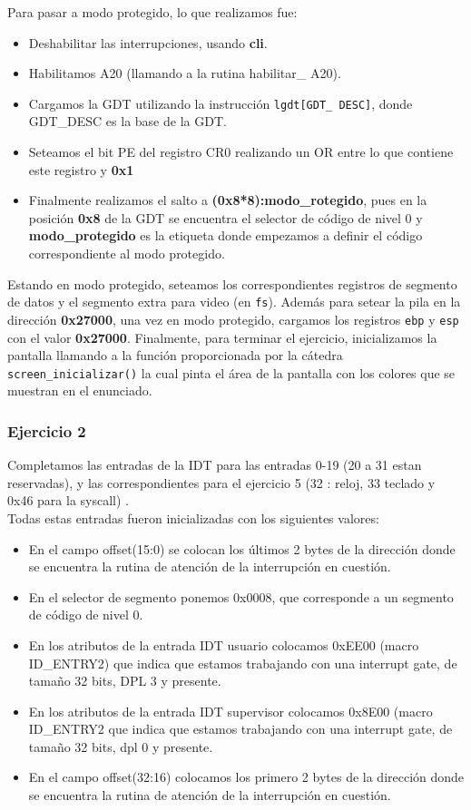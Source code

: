Para pasar a modo protegido, lo que realizamos fue:
\begin{itemize}
	\item Deshabilitar las interrupciones, usando \textbf{cli}.
	\item Habilitamos A20 (llamando a la rutina habilitar\_ A20).
	\item Cargamos la GDT utilizando la instrucción \texttt{lgdt[GDT\_ DESC]}, donde GDT\_DESC es la base de la GDT.
	\item Seteamos el bit PE del registro CR0 realizando un OR entre lo que contiene este registro y \textbf{0x1}
	\item Finalmente realizamos el salto a \textbf{(0x8*8):modo\_rotegido}, pues en la posición \textbf{0x8} de la GDT se encuentra el selector de código de nivel 0 y \textbf{modo\_protegido} es la etiqueta donde empezamos a definir el código correspondiente al modo protegido.
\end{itemize}
Estando en modo protegido, seteamos los correspondientes registros de segmento de datos y el segmento
extra para video (en \texttt{fs}). Además para setear la pila en la dirección \textbf{0x27000}, una vez en modo protegido, cargamos los registros \texttt{ebp} y \texttt{esp} con el valor \textbf{0x27000}.
Finalmente, para terminar el ejercicio, inicializamos la pantalla llamando a la función proporcionada por la cátedra \texttt{screen\_inicializar()} la cual pinta el área de la pantalla con los colores que se muestran en el enunciado.


\subsubsection{Ejercicio 2}
\indent Completamos las entradas de la IDT para las entradas 0-19 (20 a 31 estan reservadas), y las correspondientes para el ejercicio 5 (32 : reloj, 33 teclado y 0x46 para la syscall) .\\
\indent Todas estas entradas fueron inicializadas con los siguientes valores:
\begin{itemize}
 \item En el campo offset(15:0) se colocan los últimos 2 bytes de la dirección donde se encuentra la rutina de atención de la interrupción en cuestión.
 \item En el selector de segmento ponemos 0x0008, que corresponde a un segmento de código de nivel 0.
 \item En los atributos de la entrada IDT usuario colocamos 0xEE00 (macro ID\_ENTRY2) que indica que estamos trabajando con una interrupt gate, de tamaño 32 bits, DPL 3 y presente.
 \item En los atributos de la entrada IDT supervisor colocamos 0x8E00 (macro ID\_ENTRY2 que indica que estamos trabajando con una interrupt gate, de tamaño 32 bits, dpl 0 y presente.
 \item En el campo offset(32:16) colocamos los primero 2 bytes de la dirección donde se encuentra la rutina de atención de la interrupción en cuestión.
\end{itemize}

